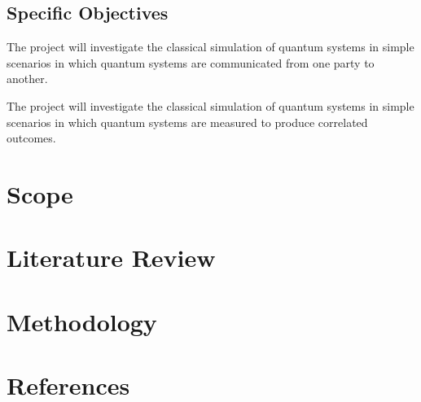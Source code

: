 \documentclass[options]{article}
\begin{document}
\subsection{Specific Objectives}
The project will investigate the classical simulation of quantum systems in simple scenarios in which quantum systems are communicated from one party to another. 

The project will investigate the classical simulation of quantum systems in simple scenarios in which quantum systems are measured to produce correlated outcomes. 

\section {\textbf{Scope}}

\section{\textbf{Literature Review }}


\section {\textbf{Methodology}}

\section{\textbf{References}}
\end{document}
